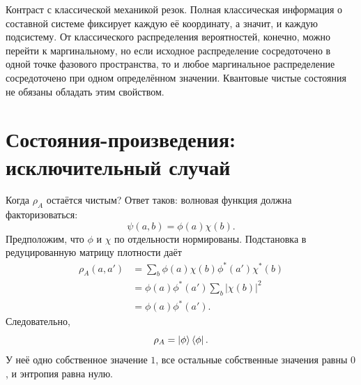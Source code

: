 \begin{classroomqa}
\end{classroomqa}

Контраст с классической механикой резок. Полная классическая информация о составной системе фиксирует каждую её координату, а значит, и каждую подсистему. От классического распределения вероятностей, конечно, можно перейти к маргинальному, но если исходное распределение сосредоточено в одной точке фазового пространства, то и любое маргинальное распределение сосредоточено при одном определённом значении. Квантовые чистые состояния не обязаны обладать этим свойством.

\begin{classroomqa}
\end{classroomqa}

\section{Состояния-произведения: исключительный случай}

Когда \(\rho_A\) остаётся чистым? Ответ таков: волновая функция должна факторизоваться:
\begin{equation}
\psi(a,b)=\phi(a)\chi(b).
\end{equation}
Предположим, что \(\phi\) и \(\chi\) по отдельности нормированы. Подстановка в редуцированную матрицу плотности даёт
\begin{align}
\rho_A(a,a')
&=\sum_b\phi(a)\chi(b)\phi^*(a')\chi^*(b) \\
&=\phi(a)\phi^*(a')\sum_b|\chi(b)|^2 \\
&=\phi(a)\phi^*(a').
\end{align}
Следовательно,
\begin{equation}
\rho_A=\left\lvert\phi\right\rangle\left\langle\phi\right\rvert.
\end{equation}
У неё одно собственное значение \(1\), все остальные собственные значения равны \(0\), и энтропия равна нулю.

